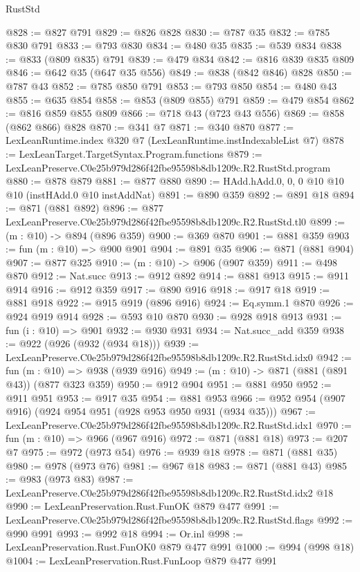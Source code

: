 \begin{lexlean}{RustStd}
\begin{coremodule}
@828 := @827 @791
@829 := @826 @828
@830 := @787 @35
@832 := @785 @830 @791
@833 := @793 @830
@834 := @480 @35
@835 := @539 @834
@838 := @833 (@809 @835) @791
@839 := @479 @834
@842 := @816 @839 @835 @809
@846 := @642 @35 (@647 @35 @556)
@849 := @838 (@842 @846) @828
@850 := @787 @43
@852 := @785 @850 @791
@853 := @793 @850
@854 := @480 @43
@855 := @635 @854
@858 := @853 (@809 @855) @791
@859 := @479 @854
@862 := @816 @859 @855 @809
@866 := @718 @43 (@723 @43 @556)
@869 := @858 (@862 @866) @828
@870 := @341 @7
@871 := @340 @870
@877 := LexLeanRuntime.index @320 @7 (LexLeanRuntime.instIndexableList @7)
@878 := LexLeanTarget.TargetSyntax.Program.functions
@879 := LexLeanPreserve.C0e25b979d286f42fbe95598b8db1209c.R2.RustStd.program
@880 := @878 @879
@881 := @877 @880
@890 := HAdd.hAdd.{0, 0, 0} @10 @10 @10 (instHAdd.{0} @10 instAddNat)
@891 := @890 @359
@892 := @891 @18
@894 := @871 (@881 @892)
@896 := @877 LexLeanPreserve.C0e25b979d286f42fbe95598b8db1209c.R2.RustStd.tl0
@899 := (m : @10) -> @894 (@896 @359)
@900 := @369 @870
@901 := @881 @359
@903 := fun (m : @10) => @900 @901
@904 := @891 @35
@906 := @871 (@881 @904)
@907 := @877 @325
@910 := (m : @10) -> @906 (@907 @359)
@911 := @498 @870
@912 := Nat.succ
@913 := @912 @892
@914 := @881 @913
@915 := @911 @914
@916 := @912 @359
@917 := @890 @916
@918 := @917 @18
@919 := @881 @918
@922 := @915 @919 (@896 @916)
@924 := Eq.symm.{1} @870
@926 := @924 @919 @914
@928 := @593 @10 @870
@930 := @928 @918 @913
@931 := fun (i : @10) => @901
@932 := @930 @931
@934 := Nat.succ_add @359
@938 := @922 (@926 (@932 (@934 @18)))
@939 := LexLeanPreserve.C0e25b979d286f42fbe95598b8db1209c.R2.RustStd.idx0
@942 := fun (m : @10) => @938 (@939 @916)
@949 := (m : @10) -> @871 (@881 (@891 @43)) (@877 @323 @359)
@950 := @912 @904
@951 := @881 @950
@952 := @911 @951
@953 := @917 @35
@954 := @881 @953
@966 := @952 @954 (@907 @916) (@924 @954 @951 (@928 @953 @950 @931 (@934 @35)))
@967 := LexLeanPreserve.C0e25b979d286f42fbe95598b8db1209c.R2.RustStd.idx1
@970 := fun (m : @10) => @966 (@967 @916)
@972 := @871 (@881 @18)
@973 := @207 @7
@975 := @972 (@973 @54)
@976 := @939 @18
@978 := @871 (@881 @35)
@980 := @978 (@973 @76)
@981 := @967 @18
@983 := @871 (@881 @43)
@985 := @983 (@973 @83)
@987 := LexLeanPreserve.C0e25b979d286f42fbe95598b8db1209c.R2.RustStd.idx2 @18
@990 := LexLeanPreservation.Rust.FunOK @879 @477
@991 := LexLeanPreserve.C0e25b979d286f42fbe95598b8db1209c.R2.RustStd.flags
@992 := @990 @991
@993 := @992 @18
@994 := Or.inl
@998 := LexLeanPreservation.Rust.FunOK0 @879 @477 @991
@1000 := @994 (@998 @18)
@1004 := LexLeanPreservation.Rust.FunLoop @879 @477 @991

\end{coremodule}
\end{lexlean}
